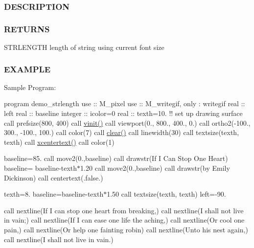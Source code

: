 \subsubsection*{D\+E\+S\+C\+R\+I\+P\+T\+I\+ON}

\subsubsection*{R\+E\+T\+U\+R\+NS}

S\+T\+R\+L\+E\+N\+G\+TH length of string using current font size

\subsubsection*{E\+X\+A\+M\+P\+LE}

Sample Program\+:

program demo\+\_\+strlength use \+:\+: M\+\_\+pixel use \+:\+: M\+\_\+writegif, only \+: writegif real \+:\+: left real \+:\+: baseline integer \+:\+: icolor=0 real \+:\+: texth=10. !! set up drawing surface call prefsize(800, 400) call \hyperlink{namespacem__pixel_ac03ca8f23fdadb60599b6ea4dc87a6d9}{vinit()} call viewport(0., 800., 400., 0.) call ortho2(-\/100., 300., -\/100., 100.) call color(7) call \hyperlink{namespacem__pixel_af3b81a21a0b2f6b5eddd09c031bd6173}{clear()} call linewidth(30) call textsize(texth, texth) call \hyperlink{namespacem__pixel_a1e0c43d36b35eafea921f91c31d8a478}{xcentertext()} call color(1)

baseline=85. call move2(0.,baseline) call drawstr(\textquotesingle{}If I Can Stop One Heart\textquotesingle{}) baseline= baseline-\/texth$\ast$1.20 call move2(0.,baseline) call drawstr(\textquotesingle{}by Emily Dickinson\textquotesingle{}) call centertext(.false.)

texth=8. baseline=baseline-\/texth$\ast$1.50 call textsize(texth, texth) left=-\/90.

call nextline(\textquotesingle{}If I can stop one heart from breaking,\textquotesingle{}) call nextline(\textquotesingle{}I shall not live in vain;\textquotesingle{}) call nextline(\textquotesingle{}If I can ease one life the aching,\textquotesingle{}) call nextline(\textquotesingle{}Or cool one pain,\textquotesingle{}) call nextline(\textquotesingle{}Or help one fainting robin\textquotesingle{}) call nextline(\textquotesingle{}Unto his nest again,\textquotesingle{}) call nextline(\textquotesingle{}I shall not live in vain.\textquotesingle{})

